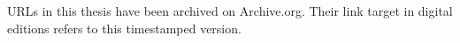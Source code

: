 \documentclass{dissertation}
\begin{document}
URLs in this thesis have been archived on Archive.org. Their link target in digital editions refers
to this timestamped version.







\glsaddall
\printglossary[type=\acronymtype,title={Glossary}]




\end{document}
